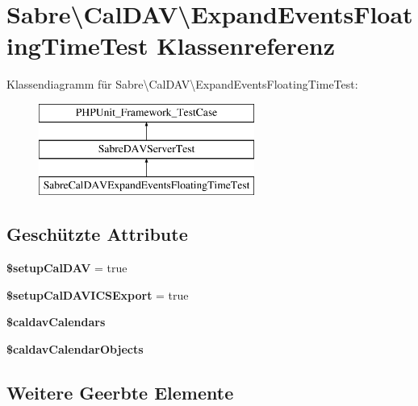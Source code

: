 \hypertarget{class_sabre_1_1_cal_d_a_v_1_1_expand_events_floating_time_test}{}\section{Sabre\textbackslash{}Cal\+D\+AV\textbackslash{}Expand\+Events\+Floating\+Time\+Test Klassenreferenz}
\label{class_sabre_1_1_cal_d_a_v_1_1_expand_events_floating_time_test}
Klassendiagramm für Sabre\textbackslash{}Cal\+D\+AV\textbackslash{}Expand\+Events\+Floating\+Time\+Test\+:\begin{figure}[H]
\begin{center}
\leavevmode
\includegraphics[height=3.000000cm]{class_sabre_1_1_cal_d_a_v_1_1_expand_events_floating_time_test}
\end{center}
\end{figure}
\subsection*{Geschützte Attribute}
\begin{DoxyCompactItemize}
\item 
\mbox{\label{class_sabre_1_1_cal_d_a_v_1_1_expand_events_floating_time_test_ae4a4dd0331605bb8e3162043c503cd28}} 
{\bfseries \$setup\+Cal\+D\+AV} = true
\item 
\mbox{\label{class_sabre_1_1_cal_d_a_v_1_1_expand_events_floating_time_test_aa634b67519dc640ea8538be4a270b0cf}} 
{\bfseries \$setup\+Cal\+D\+A\+V\+I\+C\+S\+Export} = true
\item 
{\bfseries \$caldav\+Calendars}
\item 
{\bfseries \$caldav\+Calendar\+Objects}
\end{DoxyCompactItemize}
\subsection*{Weitere Geerbte Elemente}


